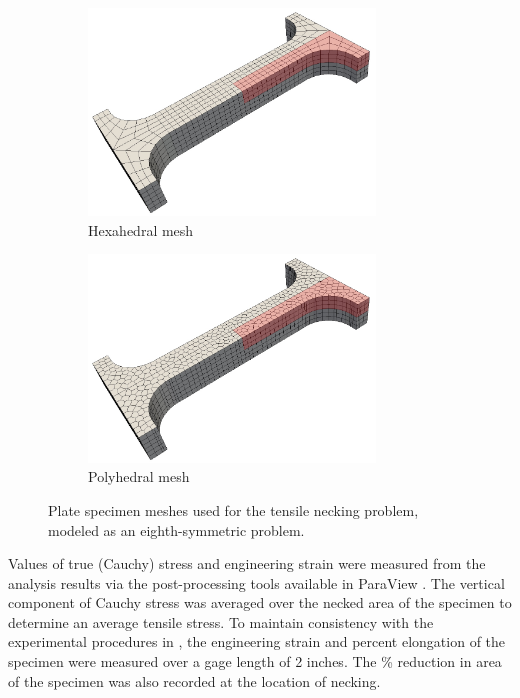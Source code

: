 \begin{figure}[!h]
  \centering
    \begin{subfigure}[b]{0.49\linewidth}
            \centering
            \includegraphics[width=3.0in]{figures/neck_hex_mesh.pdf}
    			\caption{Hexahedral mesh \label{fig:necking_hex_mesh}}
    \end{subfigure}
	\begin{subfigure}[b]{0.49\linewidth}
            \centering
            \includegraphics[width=3.0in]{figures/neck_poly_mesh.pdf}
    			\caption{Polyhedral mesh \label{fig:necking_poly_mesh}}
    \end{subfigure} \caption{Plate specimen meshes used for the tensile necking problem, modeled as an eighth-symmetric problem.}
  \label{fig:necking_meshes}
\end{figure}

Values of true (Cauchy) stress and engineering strain were measured from the analysis results via the post-processing tools available in ParaView \cite{ParaView}. The vertical component of Cauchy stress was averaged over the necked area of the specimen to determine an average tensile stress. To maintain consistency with the experimental procedures in \cite{Gerberich:62}, the engineering strain and percent elongation of the specimen were measured over a gage length of 2 inches. The \% reduction in area of the specimen was also recorded at the location of necking.

